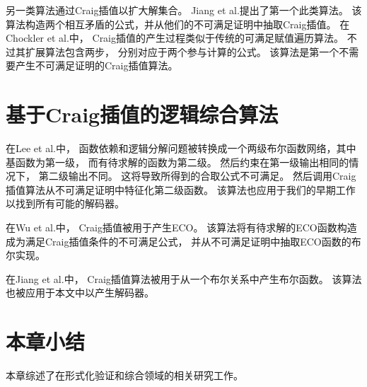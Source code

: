 另一类算法通过Craig插值以扩大解集合。
Jiang et al.提出了第一个此类算法。
该算法构造两个相互矛盾的公式，并从他们的不可满足证明中抽取Craig插值。
在Chockler et al.中，
Craig插值的产生过程类似于传统的可满足赋值遍历算法。
不过其扩展算法包含两步，
分别对应于两个参与计算的公式。
该算法是第一个不需要产生不可满足证明的Craig插值算法。

\section{基于Craig插值的逻辑综合算法}
在Lee et al.中，
函数依赖和逻辑分解问题被转换成一个两级布尔函数网络，其中基函数为第一级，
而有待求解的函数为第二级。
然后约束在第一级输出相同的情况下，
第二级输出不同。
这将导致所得到的合取公式不可满足。
然后调用Craig插值算法从不可满足证明中特征化第二级函数。
该算法也应用于我们的早期工作 以找到所有可能的解码器。

在Wu et al.中，
Craig插值被用于产生ECO。
该算法将有待求解的ECO函数构造成为满足Craig插值条件的不可满足公式，
并从不可满足证明中抽取ECO函数的布尔实现。

在Jiang et al.中，
Craig插值算法被用于从一个布尔关系中产生布尔函数。
该算法也被应用于本文中以产生解码器。

\section{本章小结}
本章综述了在形式化验证和综合领域的相关研究工作。
